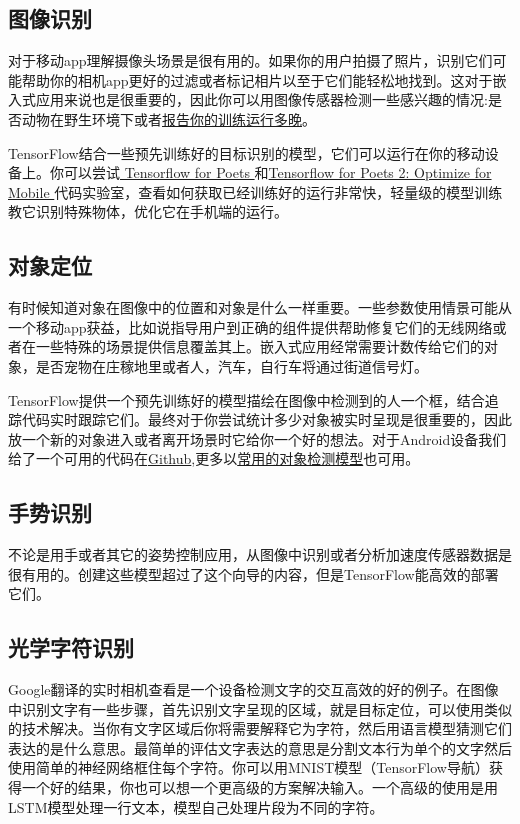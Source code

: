 \subsection{图像识别}
对于移动app理解摄像头场景是很有用的。如果你的用户拍摄了照片，识别它们可能帮助你的相机app更好的过滤或者标记相片以至于它们能轻松地找到。这对于嵌入式应用来说也是很重要的，因此你可以用图像传感器检测一些感兴趣的情况:是否动物在野生环境下或者\href{https://svds.com/tensorflow-image-recognition-raspberry-pi/}{报告你的训练运行多晚}。

TensorFlow结合一些预先训练好的目标识别的模型，它们可以运行在你的移动设备上。你可以尝试\href{https://codelabs.developers.google.com/codelabs/tensorflow-for-poets/index.html?hl=zh-cn#0}{ Tensorflow for Poets }和\href{https://codelabs.developers.google.com/codelabs/tensorflow-for-poets-2/index.html?hl=zh-cn#0}{Tensorflow for Poets 2: Optimize for Mobile }代码实验室，查看如何获取已经训练好的运行非常快，轻量级的模型训练教它识别特殊物体，优化它在手机端的运行。
\subsection{对象定位}
有时候知道对象在图像中的位置和对象是什么一样重要。一些参数使用情景可能从一个移动app获益，比如说指导用户到正确的组件提供帮助修复它们的无线网络或者在一些特殊的场景提供信息覆盖其上。嵌入式应用经常需要计数传给它们的对象，是否宠物在庄稼地里或者人，汽车，自行车将通过街道信号灯。

TensorFlow提供一个预先训练好的模型描绘在图像中检测到的人一个框，结合追踪代码实时跟踪它们。最终对于你尝试统计多少对象被实时呈现是很重要的，因此放一个新的对象进入或者离开场景时它给你一个好的想法。对于Android设备我们给了一个可用的代码在\href{https://github.com/tensorflow/tensorflow/tree/master/tensorflow/examples/android}{Github},更多以\href{https://github.com/tensorflow/models/tree/master/object_detection/README.md}{常用的对象检测模型}也可用。
\subsection{手势识别}
不论是用手或者其它的姿势控制应用，从图像中识别或者分析加速度传感器数据是很有用的。创建这些模型超过了这个向导的内容，但是TensorFlow能高效的部署它们。
\subsection{光学字符识别}
Google翻译的实时相机查看是一个设备检测文字的交互高效的好的例子。在图像中识别文字有一些步骤，首先识别文字呈现的区域，就是目标定位，可以使用类似的技术解决。当你有文字区域后你将需要解释它为字符，然后用语言模型猜测它们表达的是什么意思。最简单的评估文字表达的意思是分割文本行为单个的文字然后使用简单的神经网络框住每个字符。你可以用MNIST模型（TensorFlow导航）获得一个好的结果，你也可以想一个更高级的方案解决输入。一个高级的使用是用LSTM模型处理一行文本，模型自己处理片段为不同的字符。
